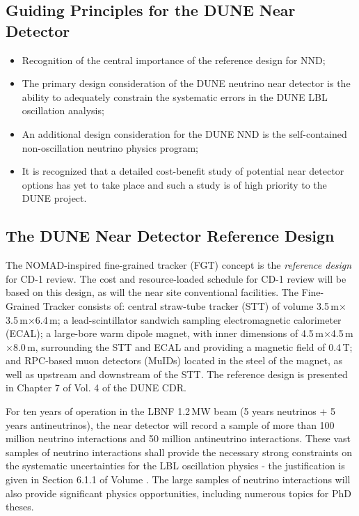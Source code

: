\subsection{Guiding Principles for the DUNE Near Detector}

\begin{itemize}
\item Recognition of the central importance of the reference design for NND;  

\item  The primary design consideration of the DUNE neutrino near detector is the 
ability to adequately constrain the systematic errors in the DUNE LBL oscillation 
analysis; 

\item An additional design consideration for the DUNE NND is the self-contained non-oscillation 
neutrino physics program;

\item It is recognized that a detailed cost-benefit study of potential near detector options 
has yet to take place and such a study is of high priority to the DUNE project.
\end{itemize}

\subsection{The DUNE Near Detector Reference Design }

The NOMAD-inspired fine-grained tracker (FGT) concept is the \textit{reference 
design} for CD-1 review. The cost and resource-loaded schedule for CD-1 review 
will be based on this design, as will the near site conventional facilities. The 
Fine-Grained Tracker consists of:  central straw-tube tracker (STT) of volume 
3.5\,m$\times$3.5\,m$\times$6.4\,m; a lead-scintillator sandwich sampling electromagnetic calorimeter 
(ECAL); a large-bore warm dipole magnet, with inner dimensions of 
4.5\,m$\times$4.5\,m$\times$8.0\,m, surrounding the STT and ECAL and providing a magnetic field of 0.4\,T; 
and RPC-based muon detectors (MuIDs) located in the steel of the magnet, as well 
as upstream and downstream of the STT. The reference 
design is presented in Chapter 
7 of Vol. 4 of the DUNE CDR. 

For ten years of operation in the LBNF 1.2\,MW beam (5 years neutrinos + 5 years 
antineutrinos), the near detector will record a sample of more than 100 million 
neutrino interactions and 50 million antineutrino interactions. These vast samples 
of neutrino interactions shall provide the necessary strong constraints on the 
systematic uncertainties for the LBL oscillation physics - the justification is 
given in Section 6.1.1 of Volume \volphys. The large samples of neutrino 
interactions will also provide significant physics opportunities, including 
numerous topics for PhD theses.  

